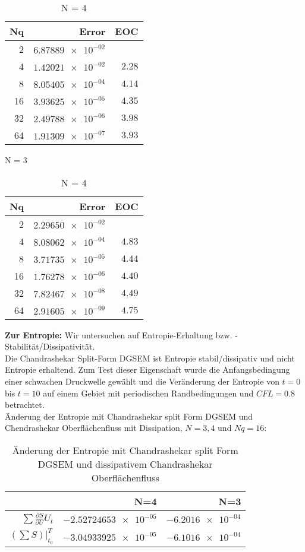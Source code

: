 \documentclass[11pt]{scrartcl}
\begin{document}
\begin{table}[H]
\parbox{.45\linewidth}{
\centering
    \begin{tabular}{|r|r|r|}
    \hline\hline
    \textbf{Nq} & \textbf{Error} & \textbf{EOC} \\\hline
    2 & $\num{6.87889e-02}$ & \\
    4 & $\num{1.42021e-02}$ & $\num{2.28}$ \\
    8 & $\num{8.05405e-04}$ & $\num{4.14}$ \\
    16 & $\num{3.93625e-05}$ & $\num{4.35}$ \\
    32 & $\num{2.49788e-06}$ & $\num{3.98}$ \\
    64 & $\num{1.91309e-07}$ & $\num{3.93}$ \\\hline\hline
  \end{tabular} 
  \caption{N = $3$}
  }
  \parbox{.45\linewidth}{
	\centering
    \begin{tabular}{|r|r|r|}
    \hline\hline
    \textbf{Nq} & \textbf{Error} & \textbf{EOC} \\\hline
    2 & $\num{2.29650e-02}$ &  \\
    4 & $\num{8.08062e-04}$ & $\num{4.83}$ \\
    8 & $\num{3.71735e-05}$ & $\num{4.44}$ \\
    16 & $\num{1.76278e-06}$ & $\num{4.40}$ \\
    32 & $\num{7.82467e-08}$ & $\num{4.49}$ \\
    64 & $\num{2.91605e-09}$ & $\num{4.75}$ \\\hline\hline
  \end{tabular}
   \caption{N = $4$}
  }
\end{table}
\textbf{Zur Entropie:} Wir untersuchen auf Entropie-Erhaltung bzw. -Stabilität/Dissipativität. \\
Die Chandrashekar Split-Form DGSEM ist Entropie stabil/dissipativ und nicht Entropie erhaltend. 
Zum Test dieser Eigenschaft wurde die Anfangsbedingung einer schwachen Druckwelle gewählt und die Veränderung der Entropie von $t=0$ bis $t=10$ auf einem Gebiet mit periodischen Randbedingungen und $CFL=0.8$ betrachtet.\\
Änderung der Entropie mit Chandrashekar split Form DGSEM und Chendrashekar Oberflächenfluss mit Dissipation, $N=3, 4$ und $Nq = 16$: 
\begin{table}[H]
\centering
\begin{tabular}{|r|r|r|}
    \hline\hline
     & \textbf{N=4} & \textbf{N=3} \\\hline
    $\sum \frac{\partial S}{\partial U} U_t$ & $\num{-2.52724653e-05}$ & $\num{-6.2016e-04}$ \\
    $\left( \sum S \right) |_{t_0}^{T}$ & $\num{-3.04933925e-05}$ & $\num{-6.1016e-04}$ \\\hline\hline
\end{tabular}
\caption{Änderung der Entropie mit Chandrashekar split Form DGSEM und dissipativem Chandrashekar Oberflächenfluss}
\end{table}
\end{document}
